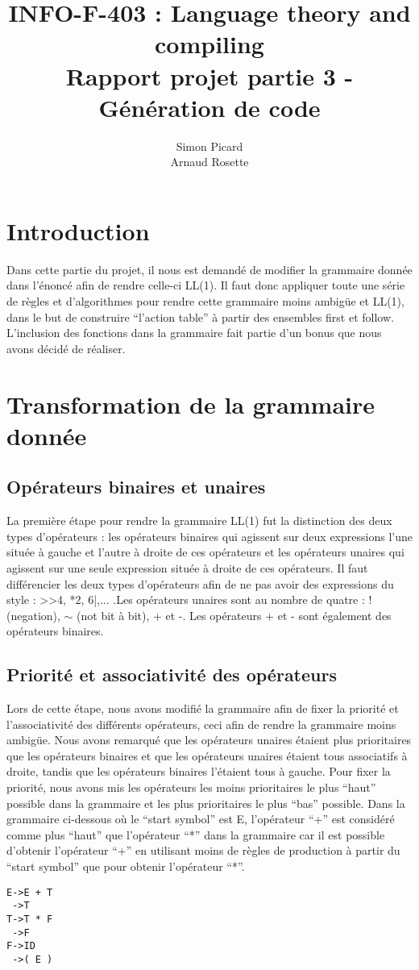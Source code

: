 \documentclass[a4paper,10pt]{article}
\title{INFO-F-403 : Language theory and compiling \\ Rapport projet partie 3 - Génération de code}
\author{Simon Picard \\ Arnaud Rosette}
\begin{document}
\maketitle
\clearpage
\tableofcontents
\clearpage

\section{Introduction}
Dans cette partie du projet, il nous est demandé de modifier la grammaire donnée dans l'énoncé afin de rendre celle-ci LL(1). Il faut donc appliquer toute une série de règles et d'algorithmes pour rendre cette grammaire moins ambigüe et LL(1), dans le but de construire ``l'action table'' à partir des ensembles first et follow. L'inclusion des fonctions dans la grammaire fait partie d'un bonus que nous avons décidé de réaliser.

\section{Transformation de la grammaire donnée}
\subsection{Opérateurs binaires et unaires}
La première étape pour rendre la grammaire LL(1) fut la distinction des deux types d'opérateurs : les opérateurs binaires qui agissent sur deux expressions l'une située à gauche et l'autre à droite de ces opérateurs et les opérateurs unaires qui agissent sur une seule expression située à droite de ces opérateurs. Il faut différencier les deux types d'opérateurs afin de ne pas avoir des expressions du style : >>4, *2, 6|,... .Les opérateurs unaires sont au nombre de quatre : ! (negation), $\sim$ (not bit à bit), + et -. Les opérateurs + et - sont également des opérateurs binaires. 
\subsection{Priorité et associativité des opérateurs}
Lors de cette étape, nous avons modifié la grammaire afin de fixer la priorité et l'associativité des différents opérateurs, ceci afin de rendre la grammaire moins ambigüe. Nous avons remarqué que les opérateurs unaires étaient plus prioritaires que les opérateurs binaires et que les opérateurs unaires étaient tous associatifs à droite, tandis que les opérateurs binaires l'étaient tous à gauche. Pour fixer la priorité, nous avons mis les opérateurs les moins prioritaires le plus ``haut'' possible dans la grammaire et les plus prioritaires le plus ``bas'' possible. 
Dans la grammaire ci-dessous où le ``start symbol'' est E, l'opérateur ``+'' est considéré comme plus ``haut'' que l'opérateur ``*'' dans la grammaire car il est possible d'obtenir l'opérateur ``+'' en utilisant moins de règles de production à partir du ``start symbol'' que pour obtenir l'opérateur ``*''.
\begin{verbatim}
E->E + T
 ->T
T->T * F
 ->F
F->ID
 ->( E )
\end{verbatim}
\end{document}
